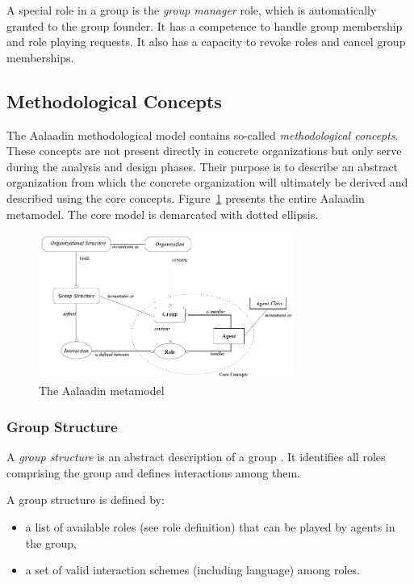 A special role in a group is the \textit{group manager} role, which is automatically granted to the group founder.
It has a competence to handle group membership and role playing requests.
It also has a capacity to revoke roles and cancel group memberships.

\subsection{Methodological Concepts}

The Aalaadin methodological model contains so-called \textit{methodological concepts}.
These concepts are not present directly in concrete organizations but only serve during the analysis and design phases.
Their purpose is to describe an abstract organization from which the concrete organization will ultimately be derived and described using the core concepts.
Figure~\ref{figure:aalaadin-metamodel} presents the entire Aalaadin metamodel. The core model is demarcated with dotted ellipsis.

\begin{figure}
\centering
\includegraphics[width=0.75\textwidth]{images/aalaadin-metamodel.png}
\caption{The Aalaadin metamodel}
\label{figure:aalaadin-metamodel}
\end{figure}

\subsubsection*{Group Structure}

A \textit{group structure} is an abstract description of a group \cite{Ferber97}.
It identifies all roles comprising the group and defines interactions among them.

A group structure is defined by:
\begin{itemize}
	\item a list of available roles (see role definition) that can be played by agents in the group,
	\item a set of valid interaction schemes (including language) among roles.
\end{itemize}

